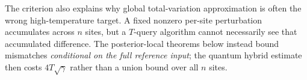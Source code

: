 The criterion also explains why global total-variation approximation is
often the wrong high-temperature target. A fixed nonzero per-site
perturbation accumulates across $n$ sites, but a $T$-query algorithm
cannot necessarily see that accumulated difference. The posterior-local
theorems below instead bound mismatches \emph{conditional on the full
reference input}; the quantum hybrid estimate then costs
$4T\sqrt{\gamma}$ rather than a union bound over all $n$ sites.

